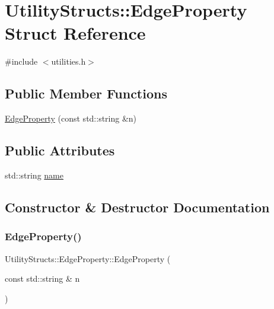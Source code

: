 \hypertarget{struct_utility_structs_1_1_edge_property}{}\section{Utility\+Structs\+:\+:Edge\+Property Struct Reference}
\label{struct_utility_structs_1_1_edge_property}


{\ttfamily \#include $<$utilities.\+h$>$}

\subsection*{Public Member Functions}
\begin{DoxyCompactItemize}
\item 
\hyperlink{struct_utility_structs_1_1_edge_property_a823e9fa8af1aba8278c8c06f67e70073_a823e9fa8af1aba8278c8c06f67e70073}{Edge\+Property} (const std\+::string \&n)
\end{DoxyCompactItemize}
\subsection*{Public Attributes}
\begin{DoxyCompactItemize}
\item 
std\+::string \hyperlink{struct_utility_structs_1_1_edge_property_a0701d898f719b1efbf795d80f503de81_a0701d898f719b1efbf795d80f503de81}{name}
\end{DoxyCompactItemize}


\subsection{Constructor \& Destructor Documentation}
\mbox{\label{struct_utility_structs_1_1_edge_property_a823e9fa8af1aba8278c8c06f67e70073_a823e9fa8af1aba8278c8c06f67e70073}} 
\subsubsection{\texorpdfstring{Edge\+Property()}{EdgeProperty()}}
{\footnotesize\ttfamily Utility\+Structs\+::\+Edge\+Property\+::\+Edge\+Property (\begin{DoxyParamCaption}\item[{const std\+::string \&}]{n }\end{DoxyParamCaption})\hspace{0.3cm}{\ttfamily [inline]}}



